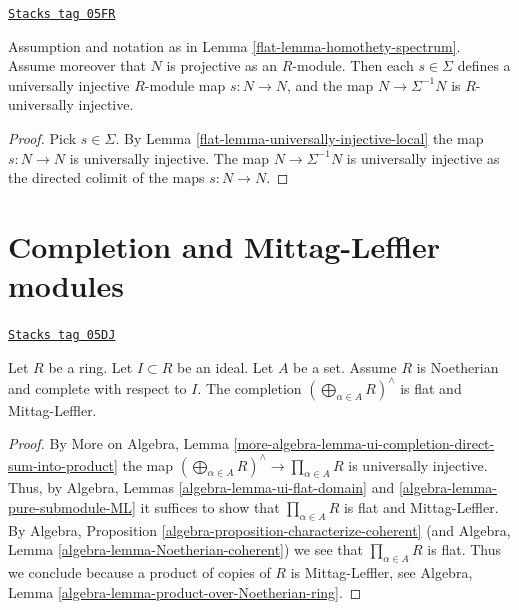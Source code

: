 \begin{lemma}
\label{flat-lemma-invert-universally-injective}
\href{https://stacks.math.columbia.edu/tag/05FR}{\texttt{Stacks tag 05FR}}

Assumption and notation as in
Lemma \ref{flat-lemma-homothety-spectrum}.
Assume moreover that $N$ is projective as an $R$-module.
Then each $s \in \Sigma$ defines a
universally injective $R$-module map $s : N \to N$, and the
map $N \to \Sigma^{-1}N$ is $R$-universally injective.
\end{lemma}

\begin{proof}

Pick $s \in \Sigma$. By
Lemma \ref{flat-lemma-universally-injective-local}
the map $s : N \to N$ is universally injective.
The map $N \to \Sigma^{-1}N$ is universally injective as the directed
colimit of the maps $s : N \to N$.
\end{proof}

\section{Completion and Mittag-Leffler modules}
\label{flat-section-completion-ML}
\begin{lemma}
\label{flat-lemma-completed-direct-sum-ML}
\href{https://stacks.math.columbia.edu/tag/05DJ}{\texttt{Stacks tag 05DJ}}

Let $R$ be a ring. Let $I \subset R$ be an ideal. Let $A$ be a set.
Assume $R$ is Noetherian and complete with respect to $I$. The completion
$(\bigoplus\nolimits_{\alpha \in A} R)^\wedge$
is flat and Mittag-Leffler.
\end{lemma}

\begin{proof}
By
More on Algebra, Lemma
\ref{more-algebra-lemma-ui-completion-direct-sum-into-product}
the map $(\bigoplus\nolimits_{\alpha \in A} R)^\wedge
\to \prod_{\alpha \in A} R$ is universally injective.
Thus, by
Algebra, Lemmas \ref{algebra-lemma-ui-flat-domain} and
\ref{algebra-lemma-pure-submodule-ML}
it suffices to show that $\prod_{\alpha \in A} R$ is flat and Mittag-Leffler.
By
Algebra, Proposition \ref{algebra-proposition-characterize-coherent}
(and
Algebra, Lemma \ref{algebra-lemma-Noetherian-coherent})
we see that $\prod_{\alpha \in A} R$ is flat.
Thus we conclude because a product of copies of $R$ is Mittag-Leffler, see
Algebra, Lemma \ref{algebra-lemma-product-over-Noetherian-ring}.
\end{proof}


